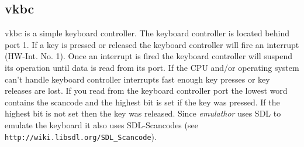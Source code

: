 \subsection{vkbc}

vkbc is a simple keyboard controller. The keyboard controller is located behind port 1. If a key is pressed or released the
keyboard controller will fire an interrupt (HW-Int. No. 1). Once an interrupt is fired the keyboard controller will suspend its operation
until data is read from its port. If the CPU and/or operating system can't handle keyboard controller interrupts fast enough key presses
or key releases are lost. If you read from the keyboard controller port the lowest word contains the scancode and the highest bit is set
if the key was pressed. If the highest bit is not set then the key was released. Since \emph{emulathor} uses SDL to emulate the keyboard
it also uses SDL-Scancodes (see \verb|http://wiki.libsdl.org/SDL_Scancode|).
